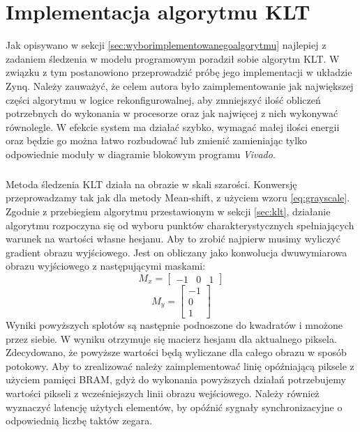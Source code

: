 \chapter{Implementacja algorytmu KLT}
\label{cha:implementacjaalgorytmuklt}

Jak opisywano w sekcji \ref{sec:wyborimplementowanegoalgorytmu} najlepiej z zadaniem śledzenia w modelu programowym poradził sobie algorytm KLT. W związku z tym postanowiono przeprowadzić próbę jego implementacji w układzie Zynq. Należy zauważyć, że celem autora było zaimplementowanie jak największej części algorytmu w logice rekonfigurowalnej, aby zmniejszyć ilość obliczeń potrzebnych do wykonania w procesorze oraz jak najwięcej z nich wykonywać równolegle. W efekcie system ma działać szybko, wymagać małej ilości energii oraz będzie go można łatwo rozbudować lub zmienić zamieniając tylko odpowiednie moduły w diagramie blokowym programu \textit{Vivado}.

\paragraph*{}
Metoda śledzenia KLT działa na obrazie w skali szarości. Konwersję przeprowadzamy tak jak dla metody Mean-shift, z użyciem wzoru \ref{eq:grayscale}. Zgodnie z przebiegiem algorytmu przestawionym w sekcji \ref{sec:klt}, działanie algorytmu rozpoczyna się od wyboru punktów charakterystycznych spełniających warunek na wartości własne hesjanu. Aby to zrobić najpierw musimy wyliczyć gradient obrazu wyjściowego. Jest on obliczany jako konwolucja dwuwymiarowa obrazu wyjściowego z następującymi maskami:
\begin{equation}
M_x=
	\begin{bmatrix}
	-1 & 0 & 1
	\end{bmatrix}
\end{equation}
\begin{equation}
M_y=
	\begin{bmatrix}
	-1 \\
	0 \\
	1
	\end{bmatrix}
\end{equation}
Wyniki powyższych splotów są następnie podnoszone do kwadratów i mnożone przez siebie. W wyniku otrzymuje się macierz hesjanu dla aktualnego piksela. Zdecydowano, że powyższe wartości będą wyliczane dla całego obrazu w sposób potokowy. Aby to zrealizować należy zaimplementować linię opóźniającą piksele z użyciem pamięci BRAM, gdyż do wykonania powyższych działań potrzebujemy wartości pikseli z wcześniejszych linii obrazu wejściowego. Należy również wyznaczyć latencję użytych elementów, by opóźnić sygnały synchronizacyjne o odpowiednią liczbę taktów zegara. 